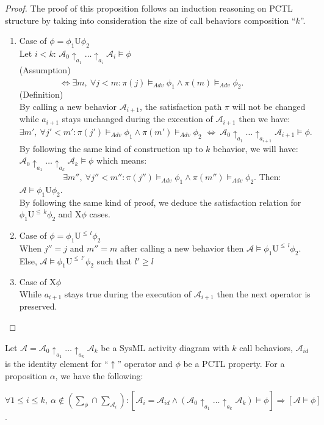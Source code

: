 \begin{proof}
The proof of this proposition follows an induction reasoning on PCTL structure by taking into consideration the size of call behaviors composition ``$k$''.
\begin{enumerate}
  \item Case of $\phi=\phi_1\mathrm{U}\phi_2$\\
   Let $i< k$: $\mathcal{A}_{0}\uparrow_{a_{1}}\ldots\uparrow_{a_{i}}\mathcal{A}_{i}\models\phi$ $~~~~~~~~~~~~~~~~~~~~~~~~~~~~~~~~~~~~~~~~~~~~~~~~~~~~~~~~~~~~~~~~~~~~~~~~~~~~~~~$(Assumption)\\
$~~~~~~~~~~~~~~~~~~~~~\Leftrightarrow \exists m,~\forall j<m:\pi(j)\models_{Adv}\phi_{1}\wedge\pi(m)\models_{Adv}\phi_{2}$. $~~~~~~~~~~~~~~~~~~~~~~~~~~$(Definition)\\
By calling a new behavior $\mathcal{A}_{i+1}$, the satisfaction path $\pi$ will not be changed while $a_{i+1}$ stays unchanged during the execution of $\mathcal{A}_{i+1}$ then we have:\\ $ \exists m',~\forall j'<m':\pi(j')\models_{Adv}\phi_{1}\wedge\pi(m')\models_{Adv}\phi_{2}$
$\Leftrightarrow ~\mathcal{A}_{0}\uparrow_{a_{1}}\ldots\uparrow_{a_{i+1}}\mathcal{A}_{i+1}\models\phi$.\\
By following the same kind of construction up to $k$ behavior, we will have:\\ $\mathcal{A}_{0}\uparrow_{a_{1}}\ldots\uparrow_{a_{k}}\mathcal{A}_{k}\models\phi$ which means: \\$~~~~~\qquad\qquad\exists m'',~\forall j''<m'':\pi(j'')\models_{Adv}\phi_{1}\wedge\pi(m'')\models_{Adv}\phi_{2}$.
 Then: $\mathcal{A}\models\phi_1\mathrm{U}\phi_2$.
\\ By following the same kind of proof, we deduce the satisfaction relation for    $\phi_1\mathrm{U}^{\leq\,k}\phi_2$ and $\mathrm{X}\phi$ cases.
  \item Case of $\phi=\phi_1\mathrm{U}^{\leq\,l}\phi_2$\\
When $j''=j$ and $m''=m$ after calling a new behavior then $\mathcal{A}\models\phi_1\mathrm{U}^{\leq\,l}\phi_2$.
Else, $\mathcal{A}\models\phi_1\mathrm{U}^{\leq\,l'}\phi_2 $ such that $l'\geq l$
 \item Case of $\mathrm{X}\phi$\\
 While $a_{i+1}$ stays true during the execution of $\mathcal{A}_{i+1}$ then the next operator is preserved.
\end{enumerate}
\end{proof}
\begin{proposition}%
Let $\mathcal{A}= \mathcal{A}_{0}\uparrow_{a_{1}}\ldots\uparrow_{a_{k}}\mathcal{A}_{k}$ be a SysML activity diagram with $k$ call behaviors, $\mathcal{A}_{id}$ is the identity element for ``$\uparrow$'' operator and $\phi$ be a PCTL property. For a proposition $\alpha$, we have the following:
\begin{center}
  $\forall 1\leq i\leq k,~\alpha\notin(\sum_{\phi}\cap\sum_{\mathcal{A}_i}):[\mathcal{A}_{i}= \mathcal{A}_{id}\wedge (\mathcal{A}_{0}\uparrow_{a_{1}}\ldots\uparrow_{a_{k}}\mathcal{A}_{k})\models\phi]\Rightarrow[\mathcal{A}\models\phi]$.
\end{center}
\end{proposition}
